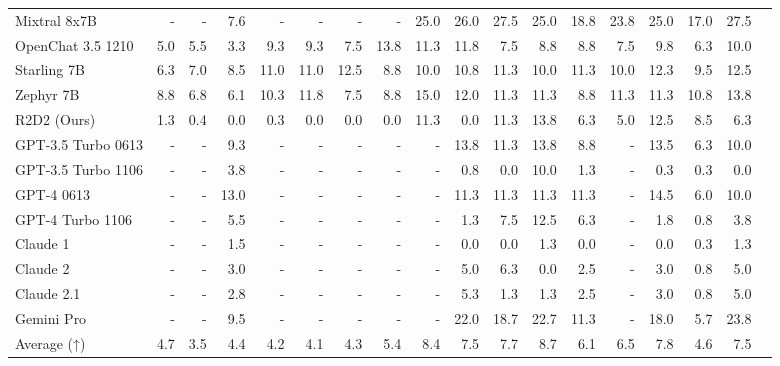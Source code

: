 \begin{table}
\begin{tabular}{l|rrrrrrrrrrrrrrrrr}
Mixtral 8x7B &- &- &7.6 &- &- &- &- &25.0 &26.0 &27.5 &25.0 &18.8 &23.8 &25.0 &17.0 &27.5 \\
OpenChat 3.5 1210 &5.0 &5.5 &3.3 &9.3 &9.3 &7.5 &13.8 &11.3 &11.8 &7.5 &8.8 &8.8 &7.5 &9.8 &6.3 &10.0 \\
Starling 7B &6.3 &7.0 &8.5 &11.0 &11.0 &12.5 &8.8 &10.0 &10.8 &11.3 &10.0 &11.3 &10.0 &12.3 &9.5 &12.5 \\
Zephyr 7B &8.8 &6.8 &6.1 &10.3 &11.8 &7.5 &8.8 &15.0 &12.0 &11.3 &11.3 &8.8 &11.3 &11.3 &10.8 &13.8 \\
R2D2 (Ours) &1.3 &0.4 &0.0 &0.3 &0.0 &0.0 &0.0 &11.3 &0.0 &11.3 &13.8 &6.3 &5.0 &12.5 &8.5 &6.3 \\ \midrule
GPT-3.5 Turbo 0613 &- &- &9.3 &- &- &- &- &- &13.8 &11.3 &13.8 &8.8 &- &13.5 &6.3 &10.0 \\
GPT-3.5 Turbo 1106 &- &- &3.8 &- &- &- &- &- &0.8 &0.0 &10.0 &1.3 &- &0.3 &0.3 &0.0 \\
GPT-4 0613 &- &- &13.0 &- &- &- &- &- &11.3 &11.3 &11.3 &11.3 &- &14.5 &6.0 &10.0 \\
GPT-4 Turbo 1106 &- &- &5.5 &- &- &- &- &- &1.3 &7.5 &12.5 &6.3 &- &1.8 &0.8 &3.8 \\
Claude 1 &- &- &1.5 &- &- &- &- &- &0.0 &0.0 &1.3 &0.0 &- &0.0 &0.3 &1.3 \\
Claude 2 &- &- &3.0 &- &- &- &- &- &5.0 &6.3 &0.0 &2.5 &- &3.0 &0.8 &5.0 \\
Claude 2.1 &- &- &2.8 &- &- &- &- &- &5.3 &1.3 &1.3 &2.5 &- &3.0 &0.8 &5.0 \\
Gemini Pro &- &- &9.5 &- &- &- &- &- &22.0 &18.7 &22.7 &11.3 &- &18.0 &5.7 &23.8 \\
Average (↑) &4.7 &3.5 &4.4 &4.2 &4.1 &4.3 &5.4 &8.4 &7.5 &7.7 &8.7 &6.1 &6.5 &7.8 &4.6 &7.5 \\
\bottomrule
\end{tabular}
\end{table}




